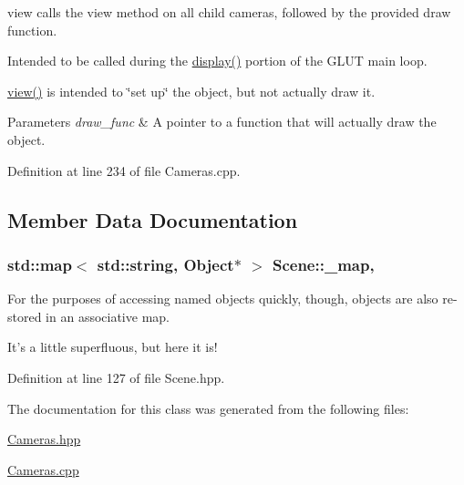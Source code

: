 view calls the view method on all child cameras, followed by the provided draw function. 

Intended to be called during the \hyperlink{ds_8cpp_a4ea013001a5fb47853d0fab8f8de35cd}{display()} portion of the G\-L\-U\-T main loop.

\hyperlink{class_cameras_adeb29c1d639fcfbae4c68017bc8ef4d4}{view()} is intended to \char`\"{}set up\char`\"{} the object, but not actually draw it.


\begin{DoxyParams}{Parameters}
{\em draw\-\_\-func} & A pointer to a function that will actually draw the object. \\
\hline
\end{DoxyParams}


Definition at line 234 of file Cameras.\-cpp.



\subsection{Member Data Documentation}
\hypertarget{class_scene_a8bd5d86484a12255b26b92b6cbf8d29a}{
\subsubsection[{\-\_\-map}]{\setlength{\rightskip}{0pt plus 5cm}std\-::map$<$ std\-::string, {\bf Object}$\ast$ $>$ Scene\-::\-\_\-map\hspace{0.3cm}{\ttfamily [protected]}, {\ttfamily [inherited]}}}\label{class_scene_a8bd5d86484a12255b26b92b6cbf8d29a}


For the purposes of accessing named objects quickly, though, objects are also re-\/stored in an associative map. 

It's a little superfluous, but here it is! 

Definition at line 127 of file Scene.\-hpp.



The documentation for this class was generated from the following files\-:\begin{DoxyCompactItemize}
\item 
\hyperlink{_cameras_8hpp}{Cameras.\-hpp}\item 
\hyperlink{_cameras_8cpp}{Cameras.\-cpp}\end{DoxyCompactItemize}
